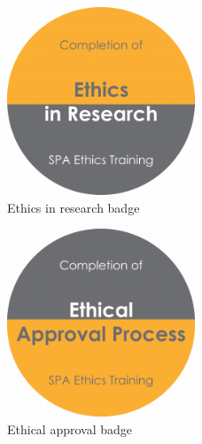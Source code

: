 
\label{sec:Appendix 2}

\begin{figure}[htbp]
    \centering
    \includegraphics[width=0.5\textwidth]{images/ethics-in-research-badge.png}
    \caption{Ethics in research badge}
\end{figure}

\begin{figure}[htbp]
    \centering
    \includegraphics[width=0.5\textwidth]{images/ethical-approval-process-badge.png}
    \caption{Ethical approval badge}
\end{figure}

